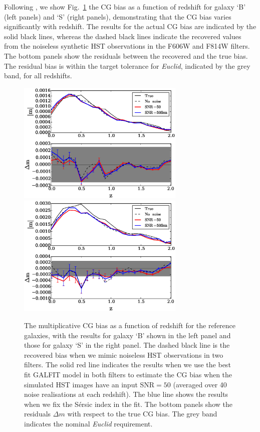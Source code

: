 \documentclass[useAMS,usenatbib]{mnras}
\begin{document}
Following , we show Fig.~\ref{fig:biasofz50} the CG bias as a function of redshift for galaxy `B' (left panels) and `S' (right panels), demonstrating that the CG bias varies significantly with redshift. The results for the actual CG bias are indicated by the solid black lines, whereas the dashed black lines indicate the recovered values from the noiseless synthetic HST observations in the F606W and F814W filters.  The bottom panels show the residuals between the recovered and the true bias. The residual bias is within the target tolerance for {\it Euclid}, indicated by the grey band, for all redshifts.

\begin{figure}
  \includegraphics[width=8.0cm]{zs2n_b_snrtt50.eps}
  \includegraphics[width=8.0cm]{zs2n_s_snrtt50.eps}
\caption{The multiplicative CG bias as a function of redshift
  for the reference galaxies, with the results for galaxy `B' shown
  in the left panel and those for galaxy `S' in the right panel.
  The dashed black line is the recovered bias when we mimic 
  noiseless HST observations in two filters. The solid red line
  indicates the results when we use the best fit {\sc GALFIT} model
  in both filters to estimate the CG bias when the simulated HST images have
  an input SNR$=50$ (averaged over 40 noise realisations at each
  redshift). The blue line shows the results when we fix the S{\'e}rsic index
  in the fit. The bottom panels show the residuals $\Delta m$ with respect
  to the true CG bias. The grey band indicates the 
  nominal {\it Euclid} requirement.}
\label{fig:biasofz50}
\end{figure}
\end{document}
